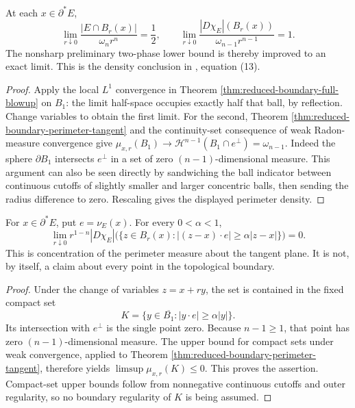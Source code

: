 \begin{corollary}\label{cor:reduced-boundary-exact-densities}
At each $x\in\partial^*E$,
\[
 \lim_{r\downarrow0}\frac{|E\cap B_r(x)|}{\omega_n r^n}=\frac12,
 \qquad
 \lim_{r\downarrow0}\frac{|D\chi_E|(B_r(x))}{\omega_{n-1}r^{n-1}}=1.
\]
The nonsharp preliminary two-phase lower bound is thereby improved to an exact limit. This is the density conclusion in \cite{Sim18}, equation (13).
\end{corollary}
\begin{proof}
Apply the local $L^1$ convergence in Theorem \ref{thm:reduced-boundary-full-blowup} on $B_1$: the limit half-space occupies exactly half that ball, by reflection. Change variables to obtain the first limit. For the second, Theorem \ref{thm:reduced-boundary-perimeter-tangent} and the continuity-set consequence of weak Radon-measure convergence give $\mu_{x,r}(B_1)\to\mathcal H^{n-1}(B_1\cap e^\perp)=\omega_{n-1}$. Indeed the sphere $\partial B_1$ intersects $e^\perp$ in a set of zero $(n-1)$-dimensional measure. This argument can also be seen directly by sandwiching the ball indicator between continuous cutoffs of slightly smaller and larger concentric balls, then sending the radius difference to zero. Rescaling gives the displayed perimeter density.
\end{proof}

\begin{corollary}\label{cor:reduced-boundary-cone-concentration}
For $x\in\partial^*E$, put $e=\nu_E(x)$. For every $0<\alpha<1$,
\[
 \lim_{r\downarrow0}r^{1-n}|D\chi_E|
 \bigl(\{z\in B_r(x):|(z-x)\cdot e|\geq\alpha|z-x|\}\bigr)=0.
\]
This is concentration of the perimeter measure about the tangent plane. It is not, by itself, a claim about every point in the topological boundary.
\end{corollary}
\begin{proof}
Under the change of variables $z=x+ry$, the set is contained in the fixed compact set
\[
 K=\{y\in\overline{B_1}:|y\cdot e|\geq\alpha|y|\}.
\]
Its intersection with $e^\perp$ is the single point zero. Because $n-1\geq1$, that point has zero $(n-1)$-dimensional measure. The upper bound for compact sets under weak convergence, applied to Theorem \ref{thm:reduced-boundary-perimeter-tangent}, therefore yields $\limsup\mu_{x,r}(K)\leq0$. This proves the assertion. Compact-set upper bounds follow from nonnegative continuous cutoffs and outer regularity, so no boundary regularity of $K$ is being assumed.
\end{proof}

